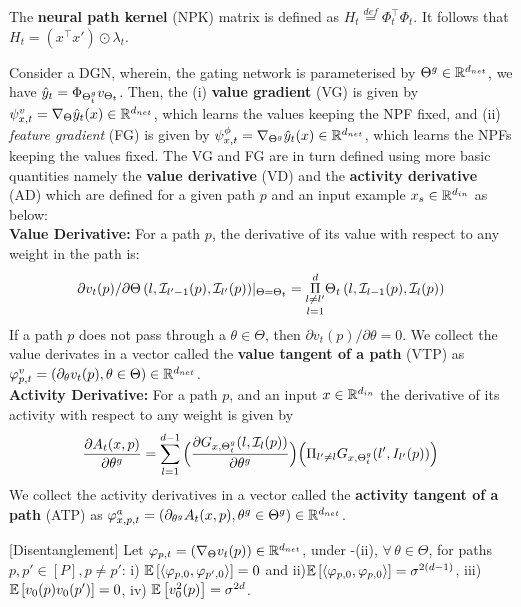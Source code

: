 \begin{lemma}\label{lm:npk}
The \textbf{neural path kernel} (NPK) matrix is defined as $H_t\stackrel{def}=\Phi^\top_t\Phi_t$. It follows that $H_t= (x^\top x')\odot\lambda_t$. 
\end{lemma}
Consider a DGN, wherein, the gating network is parameterised by ${\Theta}^g\in\mathbb{R}^{d_{net}}$,  we have $\hat{y}_t=\Phi_{{\Theta}^g_t}v_{\Theta_t}$. Then, the (i) \textbf{value gradient} (VG) is given by $\psi^v_{x,t}=\nabla_{\Theta} \hat{y}_t(x)\in\mathbb{R}^{d_{net}}$, which learns the values keeping the NPF fixed, and (ii)  \emph{feature gradient} (FG) is given by $\psi^{\phi}_{x,t}=\nabla_{{\Theta}^g} \hat{y}_t(x)\in\mathbb{R}^{d_{net}}$, which learns the NPFs keeping the values fixed. The VG and FG are in turn defined using more basic quantities namely the \textbf{value derivative} (VD) and the \textbf{activity derivative} (AD) which are defined for a given path $p$ and an input example $x_s\in\mathbb{R}^{d_{in}}$ as below:\\
\textbf{Value Derivative:} For a path $p$, the derivative of its value with respect to any weight in the path is: 
\begin{align}\label{eq:vft}{\partial v_t(p)}/{\partial \Theta\left(l,\mathcal{I}_{l'-1}(p),\mathcal{I}_{l'}(p)\right)}|_{\Theta=\Theta_t}= \underset{l=1}{\underset{l\neq l'}{\overset{d}{\Pi}}} \Theta_t\left(l,\mathcal{I}_{l-1}(p),\mathcal{I}_{l}(p)\right)
\end{align}
If a path $p$ does not pass through a $\theta\in\Theta$, then ${\partial v_t(p)}/{\partial \theta}=0$. We collect the value derivates in a vector called the \textbf{value tangent of a path} (VTP) as $\varphi^v_{p,t}=(\partial_{\theta}v_t(p),\theta\in\Theta)\in\mathbb{R}^{d_{net}}$.\\
\textbf{Activity Derivative:} For a path $p$, and an input $x\in\mathbb{R}^{d_{in}}$ the derivative of its activity with respect to any weight is given by 
\begin{align}
\frac{\partial A_{t}(x,p)}{\partial \theta^g}= \sum_{l=1}^{d-1} \Big(\frac{\partial G_{x,{\Theta}^g_t}(l,\mathcal{I}_l(p))}{\partial \theta^g} \Big)\Big(\Pi_{l'\neq l} G_{x,{\Theta}^g_t}(l',I_{l'}(p))\Big)
\end{align}
We collect the activity derivatives in a vector called the \textbf{activity tangent of a path} (ATP) as $\varphi^a_{x,p,t}=(\partial_{\theta^g}A_t(x,p),\theta^g\in{\Theta}^g)\in\mathbb{R}^{d_{net}}$.
\begin{lemma}\label{lm:disentangle}[Disentanglement] Let $\varphi_{p,t}=(\nabla_{\Theta} v_t(p))\in\mathbb{R}^{d_{net}}$, 
under -(ii), $\forall\,\theta\in\Theta$, for paths $p,p'\in [P], p\neq p'$:  i) $\mathbb{E}\left[\langle \varphi_{p,0},\varphi_{p',0}\rangle\right]= 0$ and ii)$\mathbb{E}\left[\langle \varphi_{p,0},\varphi_{p,0}\rangle\right]= \sigma^{2(d-1)}$, iii) $\mathbb{E}\left[v_0(p)v_0(p')\right]=0$, iv) $\mathbb{E}\left[v^2_0(p)\right]=\sigma^{2d}$.
\end{lemma}
